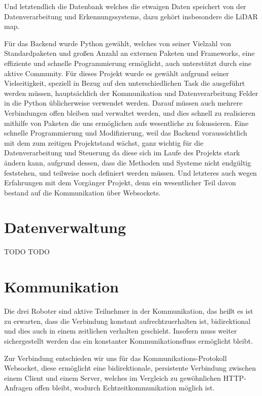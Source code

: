 Und letztendlich die Datenbank welches die etwaigen Daten speichert 
von der Datenverarbeitung und Erkennungssystems, 
dazu gehört insbesondere die LiDAR map.


Für das Backend wurde Python gewählt, 
welches von seiner Vielzahl von Standardpaketen und 
großen Anzahl an externen Paketen und Frameworks, 
eine effiziente und schnelle Programmierung ermöglicht, 
auch unterstützt durch eine aktive Community.
% 
Für dieses Projekt wurde es gewählt aufgrund seiner Vielseitigkeit, 
speziell in Bezug auf den unterschiedlichen Task die ausgeführt werden müssen, 
hauptsächlich der Kommunikation und Datenverarbeitung 
Felder in die Python üblicherweise verwendet werden.
% 
Darauf müssen auch mehrere Verbindungen offen bleiben und verwaltet werden,
und dies schnell zu realisieren mithilfe von Paketen 
die uns ermöglichen aufs wesentliche zu fokussieren.
% 
Eine schnelle Programmierung und Modifizierung, 
weil das Backend voraussichtlich mit dem zum zeitigen Projektstand wächst, 
ganz wichtig für die Datenverarbeitung und Steuerung da diese sich im Laufe des Projekts stark ändern kann,
aufgrund dessen, dass die Methoden und Systeme nicht endgültig feststehen, 
und teilweise noch definiert werden müssen.
% 
Und letzteres auch wegen Erfahrungen mit dem Vorgänger Projekt, 
denn ein wesentlicher Teil davon bestand auf die Kommunikation über Websockets.

\section{Datenverwaltung}
\label{subsec:backend_data}
TODO
TODO

\section{Kommunikation}
\label{subsec:Kommunikation}
Die drei Roboter sind aktive Teilnehmer in der Kommunikation, 
das heißt es ist zu erwarten, dass die Verbindung konstant aufrechtzuerhalten ist,
bidirektional und dies auch in einem zeitlichen verhalten geschieht. 
Insofern muss weiter sichergestellt werden das ein konstanter Kommunikationsfluss ermöglicht bleibt.

Zur Verbindung entschieden wir uns für das Kommunikations-Protokoll Websocket, 
diese ermöglicht eine bidirektionale, persistente Verbindung zwischen einem Client und einem Server,
welches im Vergleich zu gewöhnlichen HTTP-Anfragen offen bleibt, wodurch Echtzeitkommunikation möglich ist.

